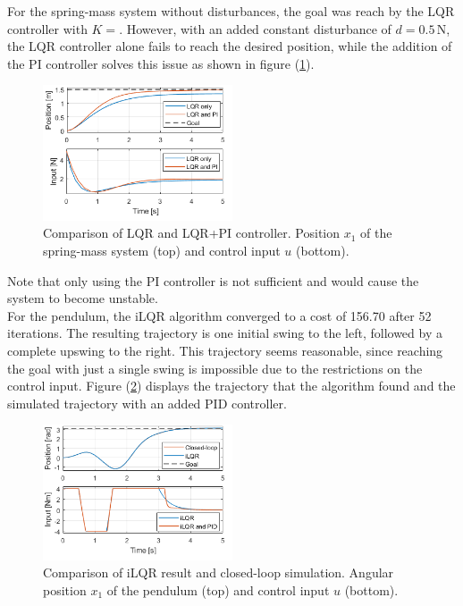\documentclass[letterpaper, 10 pt, conference]{ieeeconf}  %
\begin{document}
For the spring-mass system without disturbances, the goal was reach by the LQR controller with $K=$. However, with an added constant disturbance of $d=0.5$\,N, the LQR controller alone fails to reach the desired position, while the addition of the PI controller solves this issue as shown in figure (\ref{fig:JanSM}).
\begin{figure}[htp] 
	\centering
	\includegraphics[width=0.5\textwidth]{MS.png}
	\caption{Comparison of LQR and LQR+PI controller. Position $x_1$ of the spring-mass system (top) and control input $u$ (bottom).}
	\label{fig:JanSM}
\end{figure} 

Note that only using the PI controller is not sufficient and would cause the system to become unstable.\\

For the pendulum, the iLQR algorithm converged to a cost of 156.70 after 52 iterations. The resulting trajectory is one initial swing to the left, followed by a complete upswing to the right. This trajectory seems reasonable, since reaching the goal with just a single swing is impossible due to the restrictions on the control input. Figure (\ref{fig:JanP1}) displays the trajectory that the algorithm found and the simulated trajectory with an added PID controller.
\begin{figure}[htp] 
	\centering
	\includegraphics[width=0.5\textwidth]{P1.png}
	\caption{Comparison of iLQR result and closed-loop simulation. Angular position $x_1$ of the pendulum (top) and control input $u$ (bottom).}
	\label{fig:JanP1}
\end{figure} 
\end{document}
